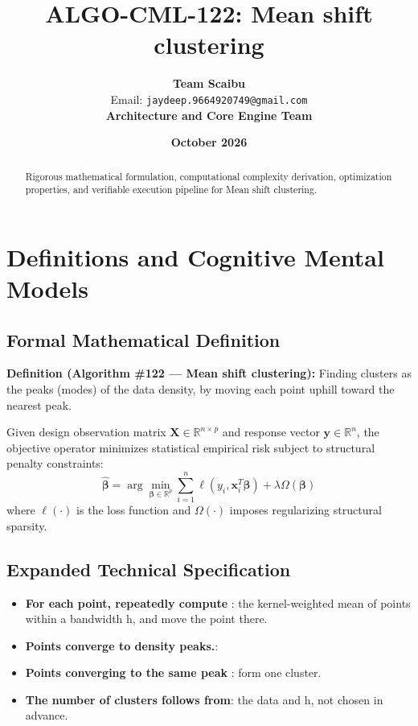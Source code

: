 \documentclass[11pt,a4paper]{article}
\title{\textbf{ALGO-CML-122: Mean shift clustering}}
\author{\textbf{Team Scaibu} \\ \small Email: \texttt{jaydeep.9664920749@gmail.com} \\ \small \textbf{Architecture and Core Engine Team}}
\date{\textbf{October 2026}}
\theoremstyle{definition}
\begin{document}
\maketitle

\begin{abstract}
Rigorous mathematical formulation, computational complexity derivation, optimization properties, and verifiable execution pipeline for Mean shift clustering.
\end{abstract}

\section{Definitions and Cognitive Mental Models}

\subsection{Formal Mathematical Definition}
\textbf{Definition (Algorithm \#122 --- Mean shift clustering):}
Finding clusters as the peaks (modes) of the data density, by moving each point uphill toward the nearest peak.

Given design observation matrix $\mathbf{X} \in \mathbb{R}^{n \times p}$ and response vector $\mathbf{y} \in \mathbb{R}^n$, the objective operator minimizes statistical empirical risk subject to structural penalty constraints:
\begin{equation}
\hat{\boldsymbol{\beta}} = \arg\min_{\boldsymbol{\beta} \in \mathbb{R}^p} \sum_{i=1}^n \ell(y_i, \mathbf{x}_i^T \boldsymbol{\beta}) + \lambda \Omega(\boldsymbol{\beta})
\end{equation}
where $\ell(\cdot)$ is the loss function and $\Omega(\cdot)$ imposes regularizing structural sparsity.

\subsection{Expanded Technical Specification}
\begin{itemize}
\item \textbf{For each point, repeatedly compute }: the kernel-weighted mean of points within a bandwidth h, and move the point there.
\item \textbf{Points converge to density peaks.}: 
\item \textbf{Points converging to the same peak }: form one cluster.
\item \textbf{The number of clusters follows from}:  the data and h, not chosen in advance.
\end{itemize}
\end{document}

